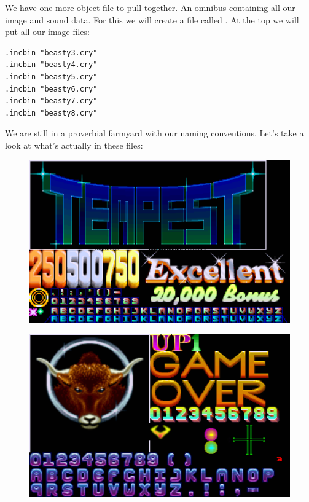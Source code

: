 We have one more object file to pull together. An omnibus containing all our image and sound data. For this
we will create a file called . At the top we will put all our image files:

\begin{lstlisting}
.incbin "beasty3.cry"
.incbin "beasty4.cry"
.incbin "beasty5.cry"
.incbin "beasty6.cry"
.incbin "beasty7.cry"
.incbin "beasty8.cry"
\end{lstlisting}

We are still in a proverbial farmyard with our naming conventions. Let's take a look at what's actually in these files:

\begin{minipage}[b]{0.48\linewidth}
\begin{figure}[H]
    \centering
    \begin{adjustbox}{width=6cm,center}
      \includegraphics[width=12cm]{cry/beasty3.png}%
    \end{adjustbox}
  \caption*{}
\end{figure}
\end{minipage}
\begin{minipage}[b]{0.48\linewidth}
\begin{figure}[H]
    \centering
    \begin{adjustbox}{width=6cm,center}
      \includegraphics[width=12cm]{cry/beasty4.png}%
    \end{adjustbox}
  \caption*{}
\end{figure}
\end{minipage}

